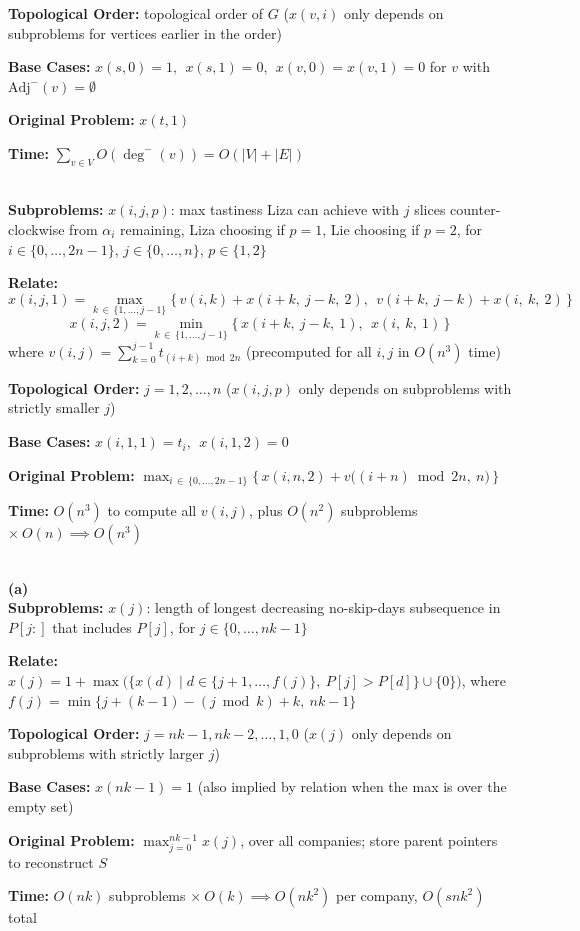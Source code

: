 \documentclass[12pt,twoside]{article}
\begin{document}
\begin{problems}
\textbf{Topological Order:} topological order of $G$ ($x(v,i)$ only depends on subproblems for vertices earlier in the order)

\textbf{Base Cases:} $x(s,0) = 1,\ \ x(s,1) = 0,\ \ x(v,0) = x(v,1) = 0$ for $v$ with $\text{Adj}^-(v) = \emptyset$

\textbf{Original Problem:} $x(t,1)$

\textbf{Time:} $\displaystyle\sum_{v \in V} O(\deg^-(v)) = O(|V| + |E|)$


\problem  %
\\
\textbf{Subproblems:} $x(i,j,p)$: max tastiness Liza can achieve with $j$ slices counter-clockwise from $\alpha_i$ remaining, Liza choosing if $p=1$, Lie choosing if $p=2$, for $i \in \{0,\dots,2n-1\}$, $j \in \{0,\dots,n\}$, $p \in \{1,2\}$

\textbf{Relate:}
\[
x(i,j,1) = \max_{k \,\in\, \{1,\dots,j-1\}} \big\{\, v(i,k) + x(i+k,\ j-k,\ 2),\ \ v(i+k,\ j-k) + x(i,\ k,\ 2) \,\big\}
\]
\[
x(i,j,2) = \min_{k \,\in\, \{1,\dots,j-1\}} \big\{\, x(i+k,\ j-k,\ 1),\ \ x(i,\ k,\ 1) \,\big\}
\]
where $v(i,j) = \sum_{k=0}^{j-1} t_{(i+k) \bmod 2n}$ (precomputed for all $i,j$ in $O(n^3)$ time)

\textbf{Topological Order:} $j = 1, 2, \dots, n$ ($x(i,j,p)$ only depends on subproblems with strictly smaller $j$)

\textbf{Base Cases:} $x(i,1,1) = t_i,\ \ x(i,1,2) = 0$

\textbf{Original Problem:} $\displaystyle\max_{i \,\in\, \{0,\dots,2n-1\}} \big\{\, x(i,n,2) + v\big((i+n) \bmod 2n,\ n\big) \,\big\}$

\textbf{Time:} $O(n^3)$ to compute all $v(i,j)$, plus $O(n^2)$ subproblems $\times\ O(n) \implies O(n^3)$


\problem  %
\\
\textbf{(a)}
\\
\textbf{Subproblems:} $x(j)$: length of longest decreasing no-skip-days subsequence in $P[j:]$ that includes $P[j]$, for $j \in \{0,\dots,nk-1\}$

\textbf{Relate:} $x(j) = 1 + \max\big(\{x(d) \mid d \in \{j+1,\dots,f(j)\},\ P[j] > P[d]\} \cup \{0\}\big)$, where $f(j) = \min\{j + (k-1) - (j \bmod k) + k,\ nk-1\}$

\textbf{Topological Order:} $j = nk-1, nk-2, \dots, 1, 0$ ($x(j)$ only depends on subproblems with strictly larger $j$)

\textbf{Base Cases:} $x(nk-1) = 1$ (also implied by relation when the max is over the empty set)

\textbf{Original Problem:} $\displaystyle\max_{j=0}^{nk-1} x(j)$, over all companies; store parent pointers to reconstruct $S$

\textbf{Time:} $O(nk)$ subproblems $\times\ O(k) \implies O(nk^2)$ per company, $O(snk^2)$ total

\end{problems}
\end{document}
